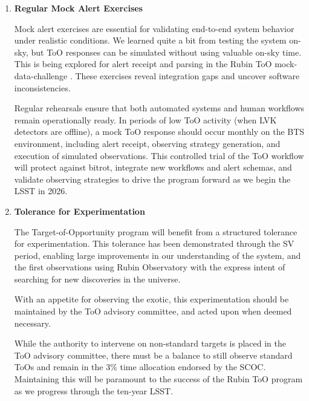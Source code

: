 \begin{enumerate}
\item \textbf{Regular Mock Alert Exercises}

Mock alert exercises are essential for validating end-to-end system behavior under realistic conditions. We learned quite a bit from testing the system on-sky, but ToO responses can be simulated without using valuable on-sky time. This is being explored for alert receipt and parsing in the Rubin ToO mock-data-challenge . These exercises reveal integration gaps and uncover software inconsistencies.

Regular rehearsals ensure that both automated systems and human workflows remain operationally ready. In periods of low ToO activity (when LVK detectors are offline), a mock ToO response should occur monthly on the BTS environment, including alert receipt, observing strategy generation, and execution of simulated observations. This controlled trial of the ToO workflow will protect against bitrot, integrate new workflows and alert schemas, and validate observing strategies to drive the program forward as we begin the LSST in 2026.

\item \textbf{Tolerance for Experimentation}

The Target-of-Opportunity program will benefit from a structured tolerance for experimentation. This tolerance has been demonstrated through the SV period, enabling large improvements in our understanding of the system, and the first observations using Rubin Observatory with the express intent of searching for new discoveries in the universe.

With an appetite for observing the exotic, this experimentation should be maintained by the ToO advisory committee, and acted upon when deemed necessary.

While the authority to intervene on non-standard targets is placed in the ToO advisory committee, there must be a balance to still observe standard ToOs and remain in the 3\% time allocation endorsed by the SCOC. Maintaining this will be paramount to the success of the Rubin ToO program as we progress through the ten-year LSST.

\end{enumerate}
